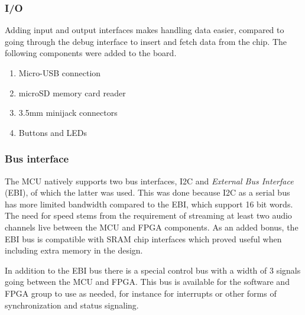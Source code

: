 \subsubsection{I/O}

Adding input and output interfaces makes handling data easier, compared to going
through the debug interface to insert and fetch data from the chip. The
following components were added to the board.

\begin{enumerate}
	\item Micro-USB connection
	\item microSD memory card reader
	\item 3.5mm minijack connectors
	\item Buttons and LEDs
\end{enumerate}

\subsubsection{Bus interface}

The MCU natively supports two bus interfaces, I2C and \textit{External Bus Interface} (EBI), of which
the latter was used. This was done because I2C as a serial bus has more limited
bandwidth compared to the EBI, which support 16 bit words. The need for speed
stems from the requirement of streaming at least two audio channels live between
the MCU and FPGA components. As an added bonus, the EBI bus is compatible with
SRAM chip interfaces which proved useful when including extra memory in the
design.

In addition to the EBI bus there is a special control bus with a width of 3
signals going between the MCU and FPGA. This bus is available for the software
and FPGA group to use as needed, for instance for interrupts or other forms of
synchronization and status signaling.

